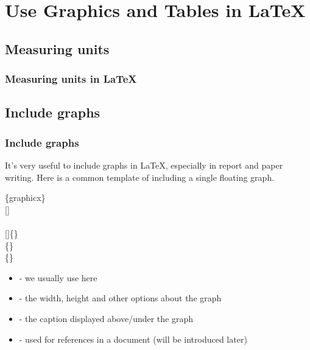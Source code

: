 \section{Use Graphics and Tables in \LaTeX}
\begin{frame}
\end{frame}

\subsection{Measuring units}

\begin{frame}
	\frametitle{Measuring units in \LaTeX}
	
\end{frame}

\subsection{Include graphs}

\begin{frame}
	\frametitle{Include graphs}
	It's very useful to include graphs in \LaTeX, especially in report and paper writing. Here is a common template of including a single floating graph.
	\begin{command}
		\{graphicx\}\\
		[]\\
		\qquad{}\\
		\qquad{}[]\{\}\\
		\qquad{}\{\}\\
		\qquad{}\{\}\\
		\begin{itemize}
			\item {} - we usually use  here
			\item {} - the width, height and other options about the graph
			\item {} - the caption displayed above/under the graph
			\item {} - used for references in a document (will be introduced later)
		\end{itemize}
	\end{command}
\end{frame}

